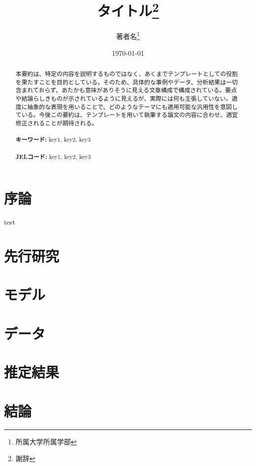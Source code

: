 \documentclass[12pt,a4paper]{ltjarticle}
\begin{document}
\begin{titlepage}
\title{タイトル\thanks{謝辞}}
\author{著者名\thanks{所属大学所属学部}}
\date{\today}
\maketitle
\begin{abstract}
 本要約は、特定の内容を説明するものではなく、あくまでテンプレートとしての役割を果たすことを目的としている。そのため、具体的な事例やデータ、分析結果は一切含まれておらず、あたかも意味がありそうに見える文章構成で構成されている。要点や結論らしきものが示されているように見えるが、実際には何も主張していない。適度に抽象的な表現を用いることで、どのようなテーマにも適用可能な汎用性を意図している。今後この要約は、テンプレートを用いて執筆する論文の内容に合わせ、適宜修正されることが期待される。\\
\vspace{0in}\\
\noindent\textbf{キーワード:} key1, key2, key3\\
\vspace{0in}\\
\noindent\textbf{JELコード:} key1, key2, key3\\

\bigskip
\end{abstract}
\setcounter{page}{0}
\thispagestyle{empty}
\end{titlepage}
\pagebreak \newpage

\section{序論}

test

\section{先行研究}

\section{モデル}

\section{データ}

\section{推定結果}

\section{結論}




\end{document}
